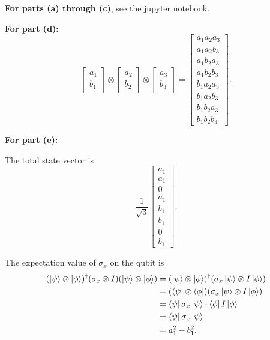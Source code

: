 \documentclass{article}
\begin{document}
\bigskip
\begin{prob}
\end{prob}
\textbf{For parts (a) through (c)}, see the jupyter notebook.
\par
\textbf{For part (d):}
\[ \begin{bmatrix}
    a_1 \\
    b_1
\end{bmatrix} \otimes \begin{bmatrix}
    a_2 \\
    b_2
\end{bmatrix} \otimes \begin{bmatrix}
    a_3 \\
    b_3
\end{bmatrix} = \begin{bmatrix}
    a_1 a_2 a_3 \\
    a_1 a_2 b_3 \\
    a_1 b_2 a_3 \\
    a_1 b_2 b_3 \\
    b_1 a_2 a_3 \\
    b_1 a_2 b_3 \\
    b_1 b_2 a_3 \\
    b_1 b_2 b_3
\end{bmatrix}. \]
\par
\textbf{For part (e):}
\par
The total state vector is
\[ \frac{1}{\sqrt{3}} \begin{bmatrix}
    a_1 \\
    a_1 \\
    0 \\
    a_1 \\
    b_1 \\
    b_1 \\
    0 \\
    b_1
\end{bmatrix}. \]
\par
The expectation value of $\sigma_x$ on the qubit is
\begin{align*}
    (\left\lvert \psi \right\rangle \otimes \left\lvert \phi \right\rangle)^\dag (\sigma_x \otimes I) (\left\lvert \psi \right\rangle \otimes \left\lvert \phi \right\rangle) &= (\left\lvert \psi \right\rangle \otimes \left\lvert \phi \right\rangle)^\dag (\sigma_x \left\lvert \psi \right\rangle \otimes I \left\lvert \phi \right\rangle) \\
                                                                                          &= (\left\langle \psi \right\rvert \otimes \left\langle \phi \right\rvert) (\sigma_x \left\lvert \psi \right\rangle \otimes I \left\lvert \phi \right\rangle) \\
                                                                                          &= \left\langle \psi \right\rvert \sigma_x \left\lvert \psi \right\rangle \cdot \left\langle \phi \right\rvert I \left\lvert \phi \right\rangle \\
                                                                                          &= \left\langle \psi \right\rvert \sigma_x \left\lvert \psi \right\rangle \\
                                                                                          &= a_1^2 - b_1^2.
\end{align*}
\end{document}
